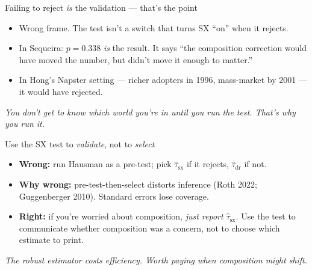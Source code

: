 \documentclass[aspectratio=169,11pt]{beamer}
\begin{document}
\begin{frame}{Failing to reject \textit{is} the validation --- that's the point}
\vspace{0.4em}
\vspace{0.4em}
\begin{itemize}\small
  \item Wrong frame. The test isn't a switch that turns SX ``on'' when it rejects. 
  \item In Sequeira: $p = 0.338$ \textit{is} the result. It says ``the composition correction would have moved the number, but didn't move it enough to matter.''
  \item In Hong's Napster setting --- richer adopters in 1996, mass-market by 2001 --- it would have rejected. 
\end{itemize}
\vspace{0.3em}
\begin{center}
\small\color{warmgray}\itshape
You don't get to know which world you're in until you run the test. \;That's why you run it.
\end{center}
\end{frame}

\begin{frame}{Use the SX test to \textit{validate}, not to \textit{select}}
\vspace{0.4em}
\begin{itemize}\small
  \item \textbf{Wrong:} run Hausman as a pre-test; pick $\widehat\tau_{\text{sx}}$ if it rejects, $\widehat\tau_{\text{dr}}$ if not.
  \item \textbf{Why wrong:} pre-test-then-select distorts inference (Roth 2022; Guggenberger 2010). Standard errors lose coverage.
  \item \textbf{Right:} if you're worried about composition, \textit{just report $\widehat\tau_{\text{sx}}$}. Use the test to communicate whether composition was a concern, not to choose which estimate to print.
\end{itemize}
\vspace{0.3em}
\begin{center}
\small\color{warmgray}\itshape
The robust estimator costs efficiency. \;Worth paying when composition might shift.
\end{center}
\end{frame}
\end{document}
